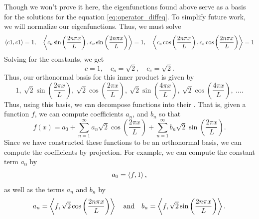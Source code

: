 Though we won't prove it here, the eigenfunctions found above serve as a basis for the solutions for the equation \ref{eq:operator_diffeq}.  To simplify future work, we will normalize our eigenfunctions. Thus, we must solve
\[
\left\langle c1, c1 \right\rangle = 1, \quad \left\langle c_o \sin\left(\frac{2n \pi x}{L}\right), c_o \sin\left(\frac{2n \pi x}{L}\right) \right\rangle=1, \quad \left\langle c_e \cos\left(\frac{2n \pi x}{L}\right), c_e \cos\left(\frac{2n \pi x}{L}\right) \right\rangle=1
\]
Solving for the constants, we get
\[
c=1, \quad c_o = \sqrt{2}, \quad c_e = \sqrt{2}.
\]
Thus, our orthonormal basis for this inner product is given by
\[
\boxed{1,~\sqrt{2}\sin\left(\frac{2 \pi x}{L}\right),~ \sqrt{2}\cos\left(\frac{2 \pi x}{L}\right), ~\sqrt{2}\sin\left(\frac{4 \pi x}{L}\right),~ \sqrt{2}\cos\left(\frac{4 \pi x}{L}\right), ~ \dots.}
\]
Thus, using this basis, we can decompose functions into their .  That is, given a function $f$, we can compute coefficients $a_n$, and $b_n$ so that
\[
f(x) = a_0 +\sum_{n=1}^\infty a_n \sqrt{2}\cos\left(\frac{2 \pi x}{L}\right)+\sum_{n=1}^\infty b_n \sqrt{2}\sin\left(\frac{2 \pi x}{L}\right).
\]
Since we have constructed these functions to be an orthonormal basis, we can compute the coefficients by projection. For example, we can compute the constant term $a_0$ by
\[
a_0 = \left\langle f, 1 \right\rangle,
\]
as well as the terms $a_n$ and $b_n$ by
\[
a_n = \left\langle f, \sqrt{2}\cos\left(\frac{2n \pi x}{L}\right) \right\rangle \quad \textrm{and} \quad b_n = \left\langle f, \sqrt{2}\sin\left(\frac{2 n\pi x}{L}\right) \right\rangle.
\]

